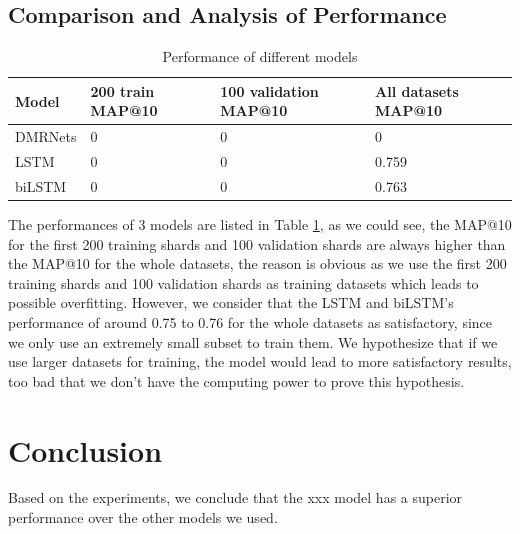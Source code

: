 \documentclass{article}
\begin{document}
\subsection{Comparison and Analysis of Performance}
\begin{table} [H]
  \caption{Performance of different models}
  \label{table 1}
  \centering
  \begin{tabular}{llll}
    \toprule
    Model     & 200 train MAP@10     & 100 validation MAP@10 & All datasets MAP@10 \\
    \midrule 
DMRNets & 0  & 0   &0  \\
LSTM & 0  & 0 & 0.759     \\
biLSTM     & 0 & 0 & 0.763      \\
    \bottomrule
  \end{tabular}
\end{table}
The performances of 3 models are listed in Table \ref{table 1}, as we could see, the MAP@10 for the first 200 training shards and 100 validation shards are always higher than the MAP@10 for the whole datasets, the reason is obvious as we use the first 200 training shards and 100 validation shards as training datasets which leads to possible overfitting. However, we consider that the LSTM and biLSTM's performance of around 0.75 to 0.76 for the whole datasets as satisfactory, since we only use an extremely small subset to train them. We hypothesize that if we use larger datasets for training, the model would lead to more satisfactory results, too bad that we don't have the computing power to prove this hypothesis.



\section{Conclusion}
Based on the experiments, we conclude that the xxx model has a superior performance over the other models we used.
\end{document}
